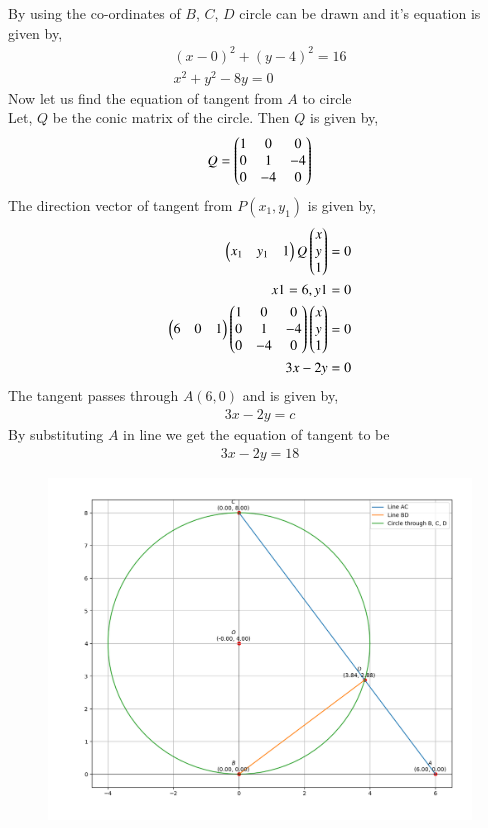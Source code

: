 \documentclass[journal]{IEEEtran}
\begin{document}
By using the co-ordinates of $B$, $C$, $D$ circle can be drawn and it's equation is given by,
\begin{align}
    (x-0)^{2}+(y-4)^{2}=16 \\
    x^2+y^2-8y=0
\end{align}
Now let us find the equation of tangent from $A$ to circle \\
Let, $Q$ be the conic matrix of the circle. Then $Q$ is given by,
\begin{align}
    Q=\begin{pmatrix}1&0&0\\0&1&-4\\0&-4&0\end{pmatrix}
\end{align}
The direction vector of tangent from $P(x_1,y_1)$ is given by,
\begin{align}
    \begin{pmatrix}x_1&y_1&1\end{pmatrix}Q\begin{pmatrix}x\\y\\1\end{pmatrix} =0\\
    x1=6,y1=0\\
    \begin{pmatrix}6&0&1\end{pmatrix}\begin{pmatrix}1&0&0\\0&1&-4\\0&-4&0\end{pmatrix}\begin{pmatrix}x\\y\\1\end{pmatrix} =0\\
    3x-2y=0
\end{align}
The tangent passes through $A(6,0)$ and is given by,
\begin{align}
    3x-2y=c
\end{align}
By substituting $A$ in line we get the equation of tangent to be 
\begin{align}
    3x-2y=18
\end{align}
\begin{figure}[h!]
   \centering
   \includegraphics[width=\linewidth]{figs/figure_1.png}
   \label{stemplot}
   \caption{}
\end{figure}
\end{document}
